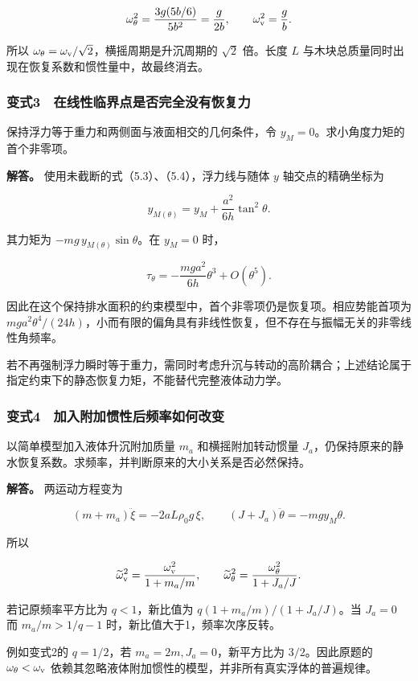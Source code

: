 \documentclass[12pt,a4paper,fontset=fandol]{ctexart}
\begin{document}
\[
\omega_\theta^2=\frac{3g(5b/6)}{5b^2}=\frac{g}{2b},
\qquad \omega_{\rm v}^2=\frac gb.
\]

所以 \(\omega_\theta=\omega_{\rm v}/\sqrt2\)，横摇周期是升沉周期的
\(\sqrt2\) 倍。长度 \(L\)
与木块总质量同时出现在恢复系数和惯性量中，故最终消去。

\subsubsection{变式3　在线性临界点是否完全没有恢复力}\label{ux53d8ux5f0f3-ux5728ux7ebfux6027ux4e34ux754cux70b9ux662fux5426ux5b8cux5168ux6ca1ux6709ux6062ux590dux529b}

保持浮力等于重力和两侧面与液面相交的几何条件，令
\(y_M=0\)。求小角度力矩的首个非零项。

\textbf{解答。} 使用未截断的式（5.3）、（5.4），浮力线与随体 \(y\)
轴交点的精确坐标为

\[
y_{M(\theta)}=y_M+\frac{a^2}{6h}\tan^2\theta.
\]

其力矩为 \(-mg\,y_{M(\theta)}\sin\theta\)。在 \(y_M=0\) 时，

\[
\tau_\theta=-\frac{mga^2}{6h}\theta^3+O(\theta^5).
\]

因此在这个保持排水面积的约束模型中，首个非零项仍是恢复项。相应势能首项为
\(mga^2\theta^4/(24h)\)，小而有限的偏角具有非线性恢复，但不存在与振幅无关的非零线性角频率。

若不再强制浮力瞬时等于重力，需同时考虑升沉与转动的高阶耦合；上述结论属于指定约束下的静态恢复力矩，不能替代完整液体动力学。

\begin{samepage}
\subsubsection{变式4　加入附加惯性后频率如何改变}\label{ux53d8ux5f0f4-ux52a0ux5165ux9644ux52a0ux60efux6027ux540eux9891ux7387ux5982ux4f55ux6539ux53d8}

以简单模型加入液体升沉附加质量 \(m_a\) 和横摇附加转动惯量
\(J_a\)，仍保持原来的静水恢复系数。求频率，并判断原来的大小关系是否必然保持。

\textbf{解答。} 两运动方程变为

\[
(m+m_a)\ddot\xi=-2aL\rho_0g\,\xi,\qquad
(J+J_a)\ddot\theta=-mgy_M\theta.
\]

所以

\[
\widetilde\omega_{\rm v}^2=\frac{\omega_{\rm v}^2}{1+m_a/m},
\qquad
\widetilde\omega_\theta^2=\frac{\omega_\theta^2}{1+J_a/J}.
\]

若记原频率平方比为 \(q<1\)，新比值为 \(q(1+m_a/m)/(1+J_a/J)\)。当
\(J_a=0\) 而 \(m_a/m>1/q-1\) 时，新比值大于1，频率次序反转。

例如变式2的 \(q=1/2\)，若 \(m_a=2m,J_a=0\)，新平方比为
\(3/2\)。因此原题的 \(\omega_\theta<\omega_{\rm v}\)
依赖其忽略液体附加惯性的模型，并非所有真实浮体的普遍规律。


\end{samepage}
\clearpage
\end{document}
